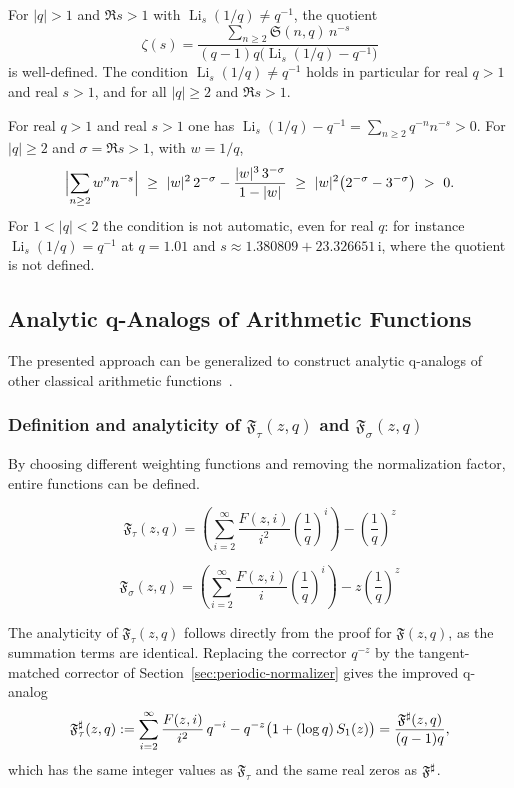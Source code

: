 \begin{corollary}\label{cor:reconstruct-zeta}
For $|q|>1$ and $\Re s>1$ with $\operatorname{Li}_s(1/q)\neq q^{-1}$, the quotient
\[
\zeta(s)=\frac{\displaystyle \sum_{n\ge2}\mathfrak{S}(n,q)\,n^{-s}}{(q-1)q\big(\operatorname{Li}_s(1/q)-q^{-1}\big)}
\]
is well-defined. The condition $\operatorname{Li}_s(1/q)\neq q^{-1}$ holds in particular for real $q>1$ and real $s>1$, and for all $|q|\ge2$ and $\Re s>1$.
\end{corollary}
\begin{remark}
For real $q>1$ and real $s>1$ one has $\operatorname{Li}_s(1/q)-q^{-1}=\sum_{n\ge2}q^{-n}n^{-s}>0$. For $|q|\ge2$ and $\sigma=\Re s>1$, with $w=1/q$,
\[
\Bigl|\sum_{n\ge2}w^{n}n^{-s}\Bigr|\ \ge\ |w|^2\,2^{-\sigma}-\frac{|w|^3\,3^{-\sigma}}{1-|w|}\ \ge\ |w|^2\bigl(2^{-\sigma}-3^{-\sigma}\bigr)\ >\ 0 .
\]
For $1<|q|<2$ the condition is not automatic, even for real $q$: for instance $\operatorname{Li}_s(1/q)=q^{-1}$ at $q=1.01$ and $s\approx1.380809+23.326651\,\mathrm{i}$, where the quotient is not defined.
\end{remark}

\subsection{Analytic q-Analogs of Arithmetic Functions}
The presented approach can be generalized to construct analytic q-analogs of other classical arithmetic functions~\cite{gasper2004}.

\subsubsection{Definition and analyticity of $\mathfrak{F}_\tau(z,q)$ and $\mathfrak{F}_\sigma(z,q)$}
By choosing different weighting functions and removing the normalization factor, entire functions can be defined.
\begin{definition}
\[\mathfrak{F}_\tau(z,q) = \left( \sum_{i=2}^{\infty} \frac{F(z,i)}{i^2} \left(\frac{1}{q}\right)^i \right) - \left(\frac{1}{q}\right)^z\]
\end{definition}
\begin{definition}
\[\mathfrak{F}_\sigma(z,q) = \left( \sum_{i=2}^{\infty} \frac{F(z,i)}{i} \left(\frac{1}{q}\right)^i \right) - z \left(\frac{1}{q}\right)^z\]
\end{definition}
The analyticity of $\mathfrak{F}_\tau(z,q)$ follows directly from the proof for $\mathfrak{F}(z,q)$, as the summation terms are identical. Replacing the corrector $q^{-z}$ by the tangent-matched corrector of Section~\ref{sec:periodic-normalizer} gives the improved q-analog
\[
\mathfrak{F}_\tau^\sharp(z,q):=\sum_{i=2}^{\infty}\frac{F(z,i)}{i^2}\,q^{-i}-q^{-z}\bigl(1+(\log q)\,S_1(z)\bigr)=\frac{\mathfrak F^{\sharp}(z,q)}{(q-1)q},
\]
which has the same integer values as $\mathfrak F_\tau$ and the same real zeros as $\mathfrak F^{\sharp}$.


